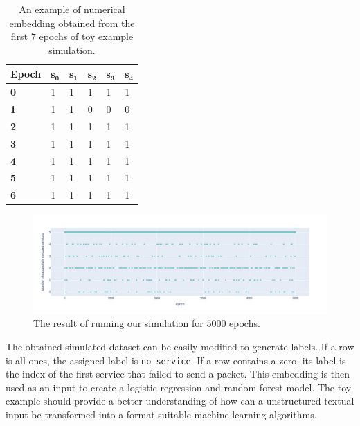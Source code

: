 \begin{table}[!h]
\centering
\begin{tabular}{@{}p{1.5cm}p{1.5cm}p{1.5cm}p{1.5cm}p{1.5cm}p{1.5cm}@{}}
\toprule
Epoch      & $\mathbf{s_0}$ & $\mathbf{s_1}$ & $\mathbf{s_2}$ & $\mathbf{s_3}$ & $\mathbf{s_4}$ \\ \toprule
\textbf{0} & 1             & 1             & 1             & 1             & 1             \\
\textbf{1} & 1             & 1             & 0             & 0             & 0             \\
\textbf{2} & 1             & 1             & 1             & 1             & 1             \\
\textbf{3} & 1             & 1             & 1             & 1             & 1             \\
\textbf{4}          & 1             & 1             & 1             & 1             & 1             \\
\textbf{5}          & 1             & 1             & 1             & 1             & 1             \\
\textbf{6}          & 1             & 1             & 1             & 1             & 1             \\ \bottomrule
\end{tabular}
\caption{An example of numerical embedding obtained from the first $7$ epochs of toy example simulation.}\label{tab:simulation}
\end{table}

\begin{figure}[!h]
        \centerline{\includegraphics[scale=.35]{img/simulation-plot.png}}
        \caption{The result of running our simulation for $5000$ epochs.}
        \label{fig:simulationPlot}
\end{figure}

The obtained simulated dataset can be easily modified to generate labels. If a row is all ones, the assigned label is \texttt{no\_service}. If a row contains a zero, its label is the index of the first service that failed to send a packet. This embedding is then used as an input to create a logistic regression and random forest model. The toy example should provide a better understanding of how can a unstructured textual input be transformed into a format suitable machine learning algorithms.

